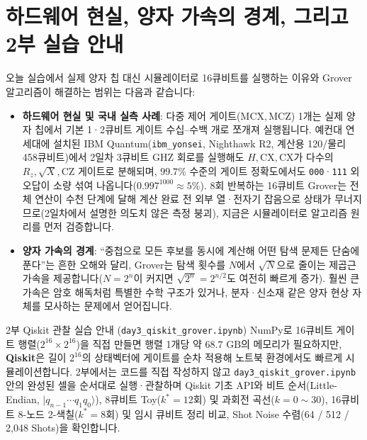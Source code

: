 \documentclass[11pt, a4paper]{article}
\newcommand{\ket}[1]{|#1\rangle}
\theoremstyle{definition}
\begin{document}
\section{하드웨어 현실, 양자 가속의 경계, 그리고 2부 실습 안내}
오늘 실습에서 실제 양자 칩 대신 시뮬레이터로 16큐비트를 실행하는 이유와 Grover 알고리즘이 해결하는 범위는 다음과 같습니다:
\begin{itemize}
    \item \textbf{하드웨어 현실 및 국내 실측 사례}: 다중 제어 게이트($\mathrm{MCX}, \mathrm{MCZ}$) 1개는 실제 양자 칩에서 기본 1·2큐비트 게이트 수십--수백 개로 쪼개져 실행됩니다. 예컨대 연세대에 설치된 IBM Quantum(\texttt{ibm\_yonsei}, Nighthawk R2, 계산용 120/물리 458큐비트)에서 2일차 3큐비트 GHZ 회로를 실행해도 $H, \mathrm{CX}, \mathrm{CX}$가 다수의 $R_z, \sqrt{X}, \mathrm{CZ}$ 게이트로 분해되며, $99.7\%$ 수준의 게이트 정확도에서도 \texttt{000}·\texttt{111} 외 오답이 소량 섞여 나옵니다($0.997^{1000} \approx 5\%$). 8회 반복하는 16큐비트 Grover는 전체 연산이 수천 단계에 달해 계산 완료 전 외부 열·전자기 잡음으로 상태가 무너지므로(2일차에서 설명한 의도치 않은 측정 붕괴), 지금은 시뮬레이터로 알고리즘 원리를 먼저 검증합니다.
    \item \textbf{양자 가속의 경계}: ``중첩으로 모든 후보를 동시에 계산해 어떤 탐색 문제든 단숨에 푼다''는 흔한 오해와 달리, Grover는 탐색 횟수를 $N$에서 $\sqrt{N}$으로 줄이는 제곱근 가속을 제공합니다($N=2^n$이 커지면 $\sqrt{2^n}=2^{n/2}$도 여전히 빠르게 증가). 훨씬 큰 가속은 암호 해독처럼 특별한 수학 구조가 있거나, 분자·신소재 같은 양자 현상 자체를 모사하는 문제에서 얻어집니다.
\end{itemize}

\begin{notebox}{2부 Qiskit 관찰 실습 안내 (\texttt{day3\_qiskit\_grover.ipynb})}
NumPy로 16큐비트 게이트 행렬($2^{16}\times 2^{16}$)을 직접 만들면 행렬 1개당 약 $68.7\text{ GB}$의 메모리가 필요하지만, \textbf{Qiskit}은 길이 $2^{16}$의 상태벡터에 게이트를 순차 적용해 노트북 환경에서도 빠르게 시뮬레이션합니다. 2부에서는 코드를 직접 작성하지 않고 \texttt{day3\_qiskit\_grover.ipynb} 안의 완성된 셀을 순서대로 실행·관찰하며 Qiskit 기초 API와 비트 순서(Little-Endian, $\ket{q_{n-1}\cdots q_1 q_0}$), 8큐비트 Toy($k^*=12$회) 및 과회전 곡선($k=0\sim 30$), 16큐비트 8-노드 2-색칠($k^*=8$회) 및 임시 큐비트 정리 비교, Shot Noise 수렴(64 / 512 / 2,048 Shots)을 확인합니다.
\end{notebox}
\end{document}
